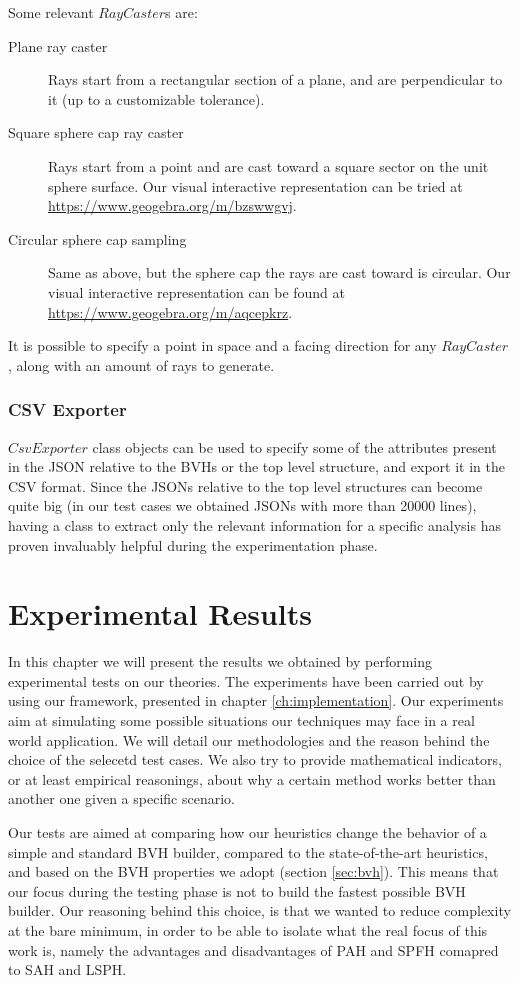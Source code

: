 \documentclass{PoliMi_MasterThesis}
\begin{document}
Some relevant $RayCaster$s are:
\begin{description}
	\item[Plane ray caster] Rays start from a rectangular section of a plane, and are perpendicular to it (up to a customizable tolerance).
	\item[Square sphere cap ray caster] Rays start from a point and are cast toward a square sector on the unit sphere surface. Our visual interactive representation can be tried at \url{https://www.geogebra.org/m/bzswwgvj}.
	\item[Circular sphere cap sampling] Same as above, but the sphere cap the rays are cast toward is circular. Our visual interactive representation can be found at \url{https://www.geogebra.org/m/aqcepkrz}.
\end{description}

It is possible to specify a point in space and a facing direction for any $RayCaster$, along with an amount of rays to generate.

\subsection{CSV Exporter}
$CsvExporter$ class objects can be used to specify some of the attributes present in the JSON relative to the BVHs or the top level structure, and export it in the CSV format. Since the JSONs relative to the top level structures can become quite big (in our test cases we obtained JSONs with more than 20000 lines), having a class to extract only the relevant information for a specific analysis has proven invaluably helpful during the experimentation phase.

\chapter{Experimental Results} \label{ch:experimental_results}
In this chapter we will present the results we obtained by performing experimental tests on our theories. The experiments have been carried out by using our framework, presented in chapter \ref{ch:implementation}. Our experiments aim at simulating some possible situations our techniques may face in a real world application. We will detail our methodologies and the reason behind the choice of the selecetd test cases. We also try to provide mathematical indicators, or at least empirical reasonings, about why a certain method works better than another one given a specific scenario.

Our tests are aimed at comparing how our heuristics change the behavior of a simple and standard BVH builder, compared to the state-of-the-art heuristics, and based on the BVH properties we adopt (section \ref{sec:bvh}). This means that our focus during the testing phase is not to build the fastest possible BVH builder. Our reasoning behind this choice, is that we wanted to reduce complexity at the bare minimum, in order to be able to isolate what the real focus of this work is, namely the advantages and disadvantages of PAH and SPFH comapred to SAH and LSPH. 
\end{document}
